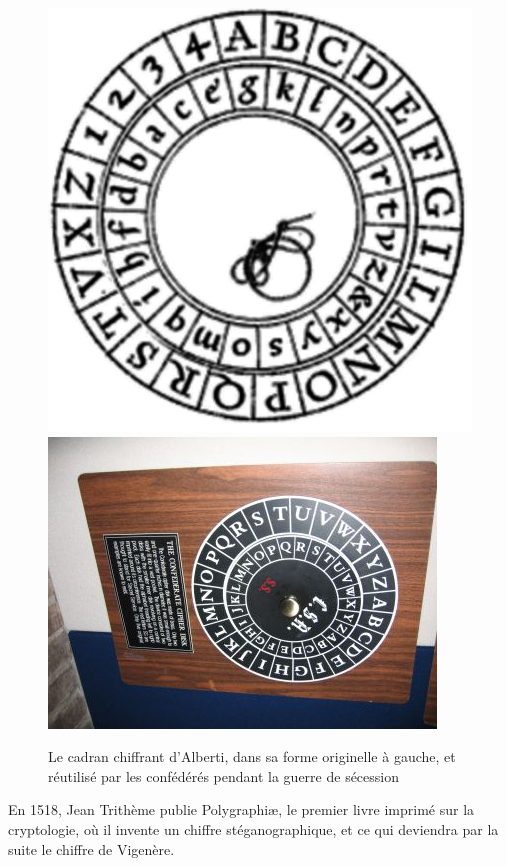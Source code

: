 \begin{figure}[h]
  \begin{center}
    \includegraphics[scale=0.2]{images/AlbertiCipherDisk.jpg}
    \hspace{3cm}
    \includegraphics[scale=1]{images/ConfederateCipherDisk.jpg}
  \end{center}
  \caption{Le cadran chiffrant d'Alberti, dans sa forme originelle à
    gauche, et réutilisé par les confédérés pendant la guerre de
    sécession}
  \label{fig:AlbertiCadranChiffrant}
\end{figure}

En 1518, Jean Trithème publie Polygraphi\ae , le premier livre imprimé
sur la cryptologie, où il invente un chiffre stéganographique, et ce
qui deviendra par la suite le chiffre de
Vigenère. \\

